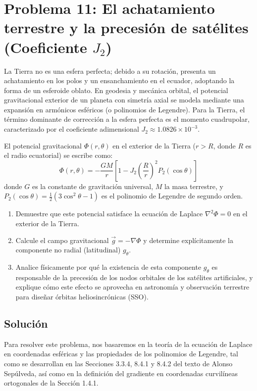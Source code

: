 \documentclass[a4paper]{article}
\begin{document}
\section{Problema 11: El achatamiento terrestre y la precesión de satélites (Coeficiente $J_2$)}

La Tierra no es una esfera perfecta; debido a su rotación, presenta un achatamiento en los polos y un ensanchamiento en el ecuador, adoptando la forma de un esferoide oblato. En geodesia y mecánica orbital, el potencial gravitacional exterior de un planeta con simetría axial se modela mediante una expansión en armónicos esféricos (o polinomios de Legendre). Para la Tierra, el término dominante de corrección a la esfera perfecta es el momento cuadrupolar, caracterizado por el coeficiente adimensional $J_2 \approx 1.0826 \times 10^{-3}$.

El potencial gravitacional $\Phi(r, \theta)$ en el exterior de la Tierra ($r > R$, donde $R$ es el radio ecuatorial) se escribe como:
$$ \Phi(r, \theta) = -\frac{GM}{r} \left[ 1 - J_2 \left(\frac{R}{r}\right)^2 P_2(\cos\theta) \right] $$
donde $G$ es la constante de gravitación universal, $M$ la masa terrestre, y $P_2(\cos\theta) = \frac{1}{2}(3\cos^2\theta - 1)$ es el polinomio de Legendre de segundo orden.

\begin{enumerate}
    \item Demuestre que este potencial satisface la ecuación de Laplace $\nabla^2 \Phi = 0$ en el exterior de la Tierra.
    \item Calcule el campo gravitacional $\vec{g} = -\nabla \Phi$ y determine explícitamente la componente no radial (latitudinal) $g_\theta$.
    \item Analice físicamente por qué la existencia de esta componente $g_\theta$ es responsable de la precesión de los nodos orbitales de los satélites artificiales, y explique cómo este efecto se aprovecha en astronomía y observación terrestre para diseñar órbitas heliosincrónicas (SSO).
\end{enumerate}

\subsection{Solución}

Para resolver este problema, nos basaremos en la teoría de la ecuación de Laplace en coordenadas esféricas y las propiedades de los polinomios de Legendre, tal como se desarrollan en las Secciones 3.3.4, 8.4.1 y 8.4.2 del texto de Alonso Sepúlveda, así como en la definición del gradiente en coordenadas curvilíneas ortogonales de la Sección 1.4.1.
\end{document}
